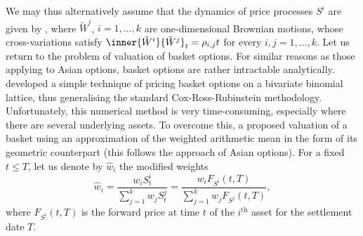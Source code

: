 We may thus alternatively assume that the dynamics of price processes $S^i$ are given by , where $\tilde{W}^i$, $i=1,\dots,k$ are one-dimensional Brownian motions, whose cross-variations satisfy $\inner{\tilde{W}^i}{\tilde{W}^j}_t = \rho_{i,j} t$ for every $i,j=1,\dots,k$. Let us return to the problem of valuation of basket options. For similar reasons as those applying to Asian options, basket options are rather intractable analytically. developed a simple technique of pricing basket options on a bivariate binomial lattice, thus generalising the standard Cox-Ross-Rubinstein methodology. Unfortunately, this numerical method is very time-consuming, especially where there are several underlying assets. To overcome this, a proposed valuation of a basket using an approximation of the weighted arithmetic mean in the form of its geometric counterpart (this follows the approach of Asian options). For a fixed $t \le T$, let us denote by $\hat{w}_i$ the modified weights
\begin{equation} \label{eq:ModifiedWeights}
	\hat{w}_i = \frac{w_i S_t^i}{\sum_{j=1}^k w_j S_t^j} = \frac{w_i F_{S^i}(t, T)}{\sum_{j=1}^k w_j F_{S^j}(t, T)},
\end{equation}
where $F_{S^i}(t, T)$ is the forward price at time $t$ of the $i^{\text{th}}$ asset for the settlement date $T$.

